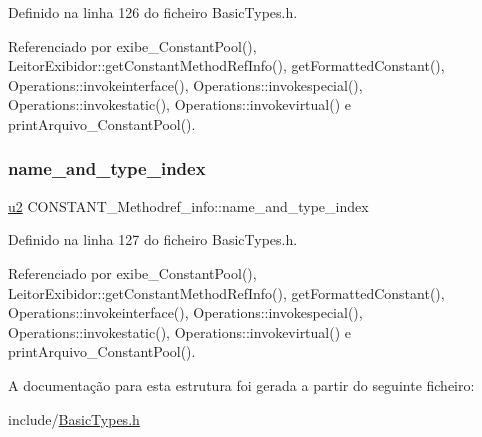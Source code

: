 Definido na linha 126 do ficheiro Basic\+Types.\+h.



Referenciado por exibe\+\_\+\+Constant\+Pool(), Leitor\+Exibidor\+::get\+Constant\+Method\+Ref\+Info(), get\+Formatted\+Constant(), Operations\+::invokeinterface(), Operations\+::invokespecial(), Operations\+::invokestatic(), Operations\+::invokevirtual() e print\+Arquivo\+\_\+\+Constant\+Pool().

\mbox{\label{structCONSTANT__Methodref__info_aa5933f9d2469d4be22a19960bb25da5e}} 
\subsubsection{\texorpdfstring{name\+\_\+and\+\_\+type\+\_\+index}{name\_and\_type\_index}}
{\footnotesize\ttfamily \hyperlink{BasicTypes_8h_a732cde1300aafb73b0ea6c2558a7a54f}{u2} C\+O\+N\+S\+T\+A\+N\+T\+\_\+\+Methodref\+\_\+info\+::name\+\_\+and\+\_\+type\+\_\+index}



Definido na linha 127 do ficheiro Basic\+Types.\+h.



Referenciado por exibe\+\_\+\+Constant\+Pool(), Leitor\+Exibidor\+::get\+Constant\+Method\+Ref\+Info(), get\+Formatted\+Constant(), Operations\+::invokeinterface(), Operations\+::invokespecial(), Operations\+::invokestatic(), Operations\+::invokevirtual() e print\+Arquivo\+\_\+\+Constant\+Pool().



A documentação para esta estrutura foi gerada a partir do seguinte ficheiro\+:\begin{DoxyCompactItemize}
\item 
include/\hyperlink{BasicTypes_8h}{Basic\+Types.\+h}\end{DoxyCompactItemize}
